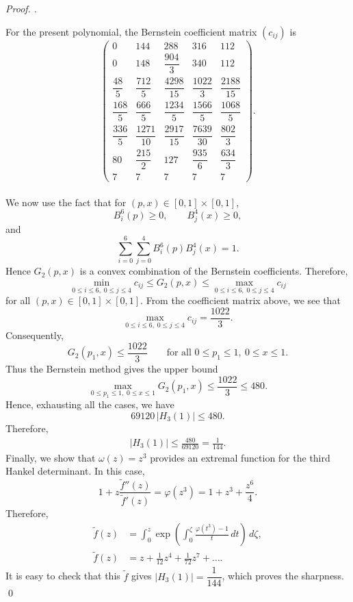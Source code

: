 \documentclass[a4paper,12pt,reqno]{amsart} %
\numberwithin{equation}{section}
\theoremstyle{definition}
\newenvironment{pf}[1][]{%
	\vskip 3mm
	\noindent
	\ifthenelse{\equal{#1}{}}%
	{{\slshape Proof. }}%
	{{\slshape #1.} }%
}%
{\qed\bigskip}
\begin{document}
\begin{pf}
For the present polynomial, the Bernstein coefficient matrix \((c_{ij})\) is \\
\[
\begin{pmatrix}
0 & 144 & 288 & 316 & 112 \\[5mm]
0 & 148 & \dfrac{904}{3} & 340 & 112 \\[5mm]
\dfrac{48}{5} & \dfrac{712}{5} & \dfrac{4298}{15} & \dfrac{1022}{3} & \dfrac{2188}{15} \\[5mm]
\dfrac{168}{5} & \dfrac{666}{5} & \dfrac{1234}{5} & \dfrac{1566}{5} & \dfrac{1068}{5} \\[5mm]
\dfrac{336}{5} & \dfrac{1271}{10} & \dfrac{2917}{15} & \dfrac{7639}{30} & \dfrac{802}{3} \\[5mm]
80 & \dfrac{215}{2} & 127 & \dfrac{935}{6} & \dfrac{634}{3} \\[5mm]
7 & 7 & 7 & 7 & 7
\end{pmatrix}.
\]\\
We now use the fact that for \((p,x)\in[0, 1]\times[0, 1]\),
\[
B_i^6(p)\ge 0,\qquad B_j^4(x)\ge 0,
\]
and
\[
\sum_{i=0}^{6}\sum_{j=0}^{4} B_i^6(p)B_j^4(x)=1.
\]
Hence \(G_2(p,x)\) is a convex combination of the Bernstein coefficients. Therefore,
\[
\min_{0\le i\le 6,\;0\le j\le 4} c_{ij}
\le
G_2(p,x)
\le
\max_{0\le i\le 6,\;0\le j\le 4} c_{ij}
\]
for all $(p,x)\in[0, 1]\times[0, 1]$.
From the coefficient matrix above, we see that
\[
\max_{0\le i\le 6,\;0\le j\le 4} c_{ij}=\frac{1022}{3}.
\]
Consequently,
\[
G_2(p_1,x)\le \frac{1022}{3}
\qquad
\text{for all }0\le p_1\le 1,\ 0\le x\le 1.
\]
Thus the Bernstein method gives the upper bound
\[
\max_{0\le p_1\le 1,\;0\le x\le 1} G_2(p_1,x)\le \frac{1022}{3}\le 480.
\]
Hence, exhausting all the cases, we have
\[
69120\,|H_3(1)|\le 480.
\]
Therefore,
\begin{align*}
|H_3(1)|\le \frac{480}{69120}=\frac{1}{144}.
\end{align*}
Finally, we show that $\omega(z)=z^3$ provides an extremal function for the third Hankel determinant. In this case,
\[
1+z\frac{\widetilde{f}''(z)}{\widetilde{f}'(z)}=\varphi(z^3)
=1+z^3+\frac{z^6}{4}.
\]
Therefore,
\begin{align*}
\widetilde{f}(z)
&=\int_{0}^{z} \exp\!\left(\int_{0}^{\zeta} \frac{\varphi(t^3)-1}{t}\,dt\right)\, d\zeta,\\[2pt]
\widetilde{f}(z)
&=z + \frac{1}{12}z^4 + \frac{1}{72} z^7+\ldots .
\end{align*}
It is easy to check that this $\widetilde{f}$ gives $|H_3(1)|=\dfrac{1}{144}$, which proves the sharpness.
\end{pf}
\vspace{3mm}
\end{document}
